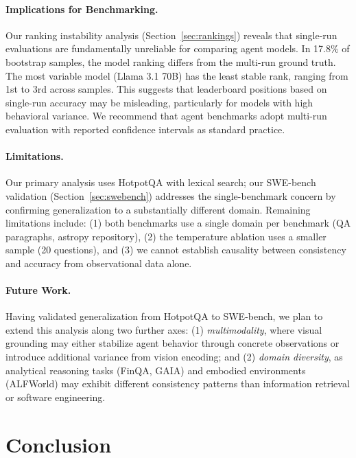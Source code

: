 \documentclass{article}
\begin{document}
\paragraph{Implications for Benchmarking.}
Our ranking instability analysis (Section~\ref{sec:rankings}) reveals that single-run evaluations are fundamentally unreliable for comparing agent models. In 17.8\% of bootstrap samples, the model ranking differs from the multi-run ground truth. The most variable model (Llama 3.1 70B) has the least stable rank, ranging from 1st to 3rd across samples. This suggests that leaderboard positions based on single-run accuracy may be misleading, particularly for models with high behavioral variance. We recommend that agent benchmarks adopt multi-run evaluation with reported confidence intervals as standard practice.

\paragraph{Limitations.}
Our primary analysis uses HotpotQA with lexical search; our SWE-bench validation (Section~\ref{sec:swebench}) addresses the single-benchmark concern by confirming generalization to a substantially different domain. Remaining limitations include: (1) both benchmarks use a single domain per benchmark (QA paragraphs, astropy repository), (2) the temperature ablation uses a smaller sample (20 questions), and (3) we cannot establish causality between consistency and accuracy from observational data alone.

\paragraph{Future Work.}
Having validated generalization from HotpotQA to SWE-bench, we plan to extend this analysis along two further axes: (1) \textit{multimodality}, where visual grounding may either stabilize agent behavior through concrete observations or introduce additional variance from vision encoding; and (2) \textit{domain diversity}, as analytical reasoning tasks (FinQA, GAIA) and embodied environments (ALFWorld) may exhibit different consistency patterns than information retrieval or software engineering.

\section{Conclusion}
\end{document}
